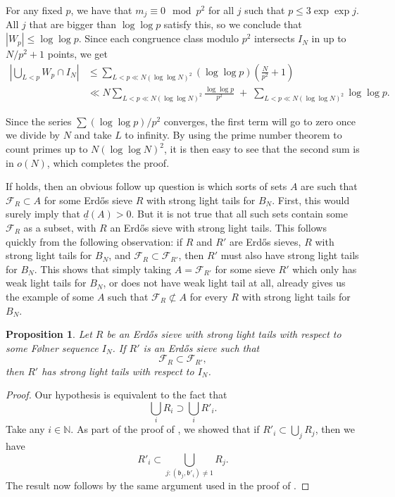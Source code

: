 \documentclass[a4paper,11pt,reqno]{amsart}
\theoremstyle{plain}
\newtheorem{proposition}[theorem]{Proposition}
\theoremstyle{remark}
\newcommand{\fr}{\mathcal{F}_R}
\newcommand{\frp}{\mathcal{F}_{R'}}
\newcommand{\gb}{\mathfrak{b}}
\begin{document}
				For any fixed $p$, we have that $m_j \equiv 0 \mod p^2$ for all $j$ such that $p \leq 3 \exp \exp j$. All $j$ that are bigger than $\log \log p$ satisfy this, so we conclude that $|W_p| \leq \log \log p$. Since each congruence class modulo $p^2$ intersects $I_N$ in up to $N/p^2+1$ points, we get 
				\begin{align*}
					\left|\bigcup_{L < p} W_p \cap I_N\right|
					&\le
					\sum_{L < p \ll N(\log \log N)^2}
					(\log \log p)\left(\frac{N}{p^2} + 1 \right) \\[4pt]
					&\ll
					N \sum_{L < p \ll N(\log \log N)^2}
					\frac{\log \log p}{p^2}
					\;+\;
					\sum_{L < p \ll N(\log \log N)^2}
					\log \log p .
				\end{align*}
				
				Since the series $\sum (\log \log p)/p^2$ converges, the first term will go to zero once we divide by $N$ and take $L$ to infinity. By using the prime number theorem to count primes up to $N(\log \log N)^2$, it is then easy to see that the second sum is in $o(N)$, which completes the proof.
				
			
				
				If  holds, then an obvious follow up question is which sorts of sets $A$ are such that $\fr \subset A$ for some Erdős sieve $R$ with strong light tails for $B_N$. First, this would surely imply that $\underline{d}(A)>0$. But it is not true that all such sets contain some $\fr$ as a subset, with $R$ an Erdős sieve with strong light tails. This follows quickly from the following observation: if $R$ and $R'$ are Erdős sieves, $R$ with strong light tails for $B_N$, and $\fr \subset \frp$, then $R'$ must also have strong light tails for $B_N$. This shows that simply taking $A = \frp$ for some sieve $R'$ which only has weak light tails for $B_N$, or does not have weak light tail at all, already gives us the example of some $A$ such that $\fr \not \subset A$ for every $R$ with strong light tails for $B_N$.
				
				\begin{proposition}
					\label{prop: slt subset imples slt}
					Let $R$ be an Erdős sieve with strong light tails with respect to some Følner sequence $I_N$. If $R'$ is an Erdős sieve such that $$\fr \subset \frp,$$ then $R'$ has strong light tails with respect to $I_N$.
				\end{proposition}
				
				\begin{proof}
					Our hypothesis is equivalent to the fact that $$\bigcup_i R_i \supset \bigcup_i R'_i.$$ Take any $i \in \mathbb{N}$. As part of the proof of , we showed that if $R'_i \subset \bigcup_j R_j$, then we have $$R'_i \subset \bigcup_{j:(\gb_j,\gb'_i) \neq 1} R_j. $$
					The result now follows by the same argument used in the proof of .
				\end{proof}
				
\end{document}
